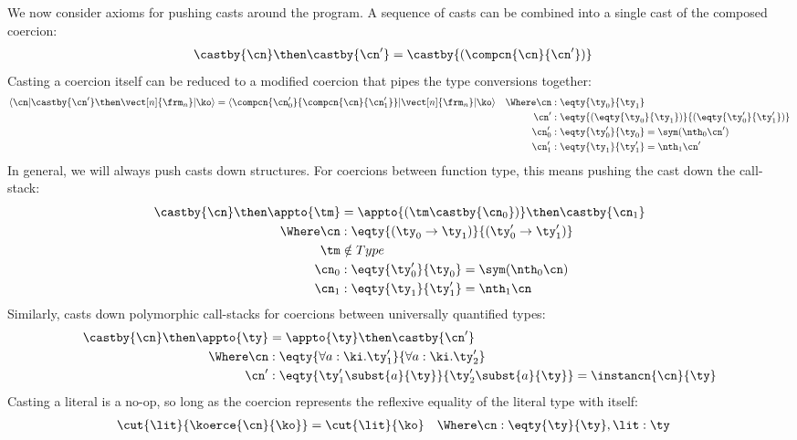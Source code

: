 \documentclass{article}
\begin{document}
We now consider axioms for pushing casts around the program.  A sequence of
casts can be combined into a single cast of the composed coercion:
\begin{align*}
  \castby{\cn} \then \castby{\cn'}
  &=
  \castby{(\compcn{\cn}{\cn'})}
\end{align*}
Casting a coercion itself can be reduced to a modified coercion that pipes the
type conversions together:
\begin{align*}
  \braket{\cn | \castby{\cn'} \then \vect[n]{\frm_n} | \ko }
  &=
  \braket{\compcn{\cn'_0}{\compcn{\cn}{\cn'_1}} | \vect[n]{\frm_n} | \ko}
  &
  \Where
  \cn &: \eqty{\ty_0}{\ty_1}
  \\ &&
  \cn' &: \eqty{(\eqty{\ty_0}{\ty_1})}{(\eqty{\ty'_0}{\ty'_1})}
  \\ &&
  \cn'_0 &: \eqty{\ty'_0}{\ty_0} = \sym(\nth_0 \cn')
  \\ &&
  \cn'_1 &: \eqty{\ty_1}{\ty'_1} = \nth_1 \cn'
\end{align*}
In general, we will always push casts down structures.  For coercions between
function type, this means pushing the cast down the call-stack:
\begin{align*}
  \castby{\cn} \then \appto{\tm}
  &=
  \appto{(\tm \castby{\cn_0})} \then \castby{\cn_1}
  \\
  \Where
  \cn &: \eqty{(\ty_0 \to \ty_1)}{(\ty_0' \to \ty_1')}
  \\
  \tm &\notin Type
  \\
  \cn_0 &: \eqty{\ty'_0}{\ty_0} = \sym (\nth_0 \cn)
  \\
  \cn_1 &: \eqty{\ty_1}{\ty'_1} = \nth_1 \cn
\end{align*}
Similarly, casts down polymorphic call-stacks for coercions between universally
quantified types:
\begin{align*}
  \castby{\cn} \then \appto{\ty}
  &=
  \appto{\ty} \then \castby{\cn'}
  \\
  \Where
  \cn &: \eqty{\forall a:\ki. \ty'_1}{\forall a:\ki. \ty'_2}
  \\
  \cn' &: \eqty{\ty'_1\subst{a}{\ty}}{\ty'_2\subst{a}{\ty}} = \instancn{\cn}{\ty}
\end{align*}
Casting a literal is a no-op, so long as the coercion represents the reflexive
equality of the literal type with itself:
\begin{align*}
  \cut{\lit}{\koerce{\cn}{\ko}}
  &=
  \cut{\lit}{\ko}
  &
  \Where
  \cn &: \eqty{\ty}{\ty}
  ,
  \lit : \ty
\end{align*}
\end{document}

